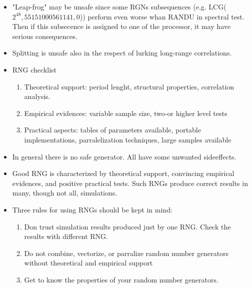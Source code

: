 \documentclass[10pt,a4paper]{article}
\begin{document}
\begin{itemize}
\item "Leap-frog" may be unsafe since some RGNs subsequences (e.g. LCG($2^{48},55151000561141,0$)) perform even worse whan RANDU in spectral test.
Then if this subsecence is assigned to one of the processor, it may have serious consequences. 
\item Splitting is unsafe also in the respect of lurking long-range correlations.
\item RNG checklist
 \begin{enumerate}
  \item Theoretical support: period lenght, structural properties, correlation analysis.
  \item Empirical evidences: variable sample size, two-or higher level tests
  \item Practical aspects: tables of parameters available, portable implementations, parralelization techniques, large samples available
 \end{enumerate}
\item In general there is no safe generator. All have some unwanted sideeffects. 
\item Good RNG is characterized by theoretical support, convincing empirical evidences, and positive practical tests. Such RNGs produce correct results in many, though not all, simulations.
\item Three rules for using RNGs should be kept in mind:
\begin{enumerate}
 \item Don trust simulation results produced just by one RNG. Check the results with different RNG.
 \item Do not combine, vectorize, or parralize random number generators without theoretical and empirical support
 \item Get to know the properties of your random number generators.
\end{enumerate}

\end{itemize}


\thispagestyle{empty} %




\clearpage
\end{document}
